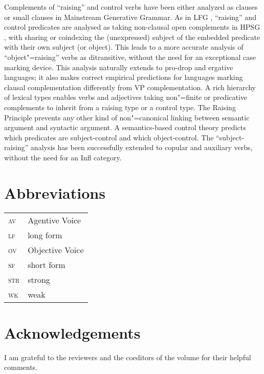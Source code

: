\documentclass[output=paper
	        ,collection
	        ,collectionchapter
 	        ,biblatex
                ,babelshorthands
                ,newtxmath
                ,draftmode
                ,colorlinks, citecolor=brown
]{langscibook}
\begin{document}
Complements of ``raising'' and control verbs have been either analyzed as clauses \citep{Chomsky81a}\addpages
or small clauses \citep{Stowell81a-u,Stowell1983}\addpages in Mainstream Generative Grammar.  As in LFG
\citep{Bresnan1982}, ``raising'' and control predicates are analysed as taking non-clausal open
complements in HPSG \citep{PollardandSag1994}\addpages, with sharing or coindexing the (unexpressed) subject
of the embedded predicate with their own subject (or object). This leads to a more accurate analysis
of ``object"=raising'' verbs as ditransitive, without the need for an exceptional case marking
device. This analysis naturally extends to pro-drop and ergative languages; it also makes correct
empirical predictions for languages marking clausal complementation differently from VP
complementation. A rich hierarchy of lexical types enables verbs and adjectives taking non"=finite
or predicative complements to inherit from a raising type or a control type. The Raising Principle
prevents any other kind of non"=canonical linking between semantic argument and syntactic
argument. A semantics-based control theory predicts which predicates are subject-control and which
object-control. The ``subject-raising'' analysis has been successfully extended to copular and
auxiliary verbs, without the need for an Infl category.




\section*{Abbreviations}

\begin{tabularx}{.45\textwidth}{@{}lX}
\textsc{av} & Agentive Voice\\
\textsc{lf} & long form\\ 
\textsc{ov} & Objective Voice\\
\textsc{sf} & short form\\
\textsc{str} & strong\\
\textsc{wk} & weak\\

\end{tabularx}

\section*{Acknowledgements}

I am grateful to the reviewers and the coeditors of the volume for their helpful comments.
{\sloppy
\printbibliography[heading=subbibliography,notkeyword=this] 
}
\end{document}
